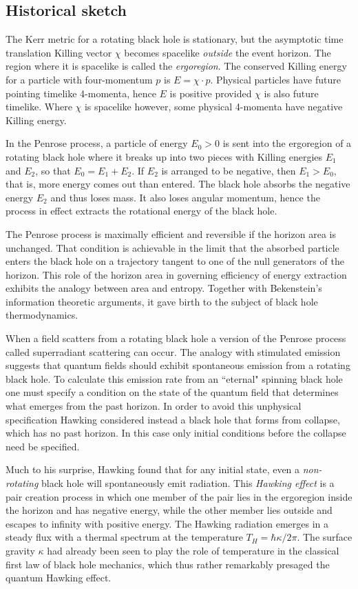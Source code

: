\documentclass[12pt]{article}
\begin{document}
\subsection{Historical sketch}
The Kerr metric for a rotating black
hole is stationary, but the asymptotic time translation Killing vector
$\chi$ becomes spacelike {\it outside} the event horizon. 
The region where it is spacelike is called the {\it ergoregion}. 
The conserved Killing energy for a particle with four-momentum $p$
is $E=\chi\cdot p$. Physical particles have future pointing timelike 
4-momenta, hence $E$ is positive provided $\chi$ is also future timelike. 
Where $\chi$ is spacelike however, some physical 4-momenta have negative Killing energy.

In the Penrose process, a particle of energy $E_0>0$ is sent 
into the ergoregion of a rotating black hole where it breaks up 
into two pieces with Killing energies $E_1$ and $E_2$, so that 
$E_0=E_1+E_2$. If $E_2$ is arranged to be negative, then $E_1>E_0$,
that is, more energy comes out than entered. 
The black hole absorbs the negative energy $E_2$ and thus
loses mass. It also loses angular momentum,
hence the process in effect extracts the rotational energy of 
the black hole. 

The Penrose process is maximally efficient and reversible if
the horizon area is unchanged. That condition is achievable in
the limit that the absorbed particle enters the black hole on a trajectory
tangent to one of the null generators of the horizon. This 
role of the horizon area in governing efficiency of energy extraction
exhibits the analogy between area and entropy. Together with Bekenstein's
information theoretic arguments, it gave birth to the subject of
black hole thermodynamics.

When a field scatters from a rotating black hole
a version of the Penrose process called
superradiant scattering can occur. 
The analogy with stimulated 
emission suggests that quantum fields should exhibit 
spontaneous emission from a rotating black hole. 
To calculate this emission rate from an ``eternal"
spinning black hole one must specify a condition on the
state of the quantum field that determines what emerges
from the past horizon. In order to avoid this unphysical
specification Hawking considered instead
a black hole that forms from collapse, which has no past
horizon. In this case only  initial conditions 
before the collapse need be specified. 

Much to his surprise,
Hawking found that for any initial state, even 
a {\it non-rotating} black hole will spontaneously
emit radiation. This {\it Hawking effect}
is a pair creation process in which one member of the pair
lies in the ergoregion inside the horizon and has negative
energy, while the other member lies outside 
and escapes to infinity with positive energy.
The Hawking radiation emerges in a steady flux
with a thermal spectrum at the temperature
$T_H=\hbar\kappa/2\pi$. The surface gravity $\kappa$
had already been seen to play the role of temperature 
in the classical first law of black hole mechanics, which thus
rather remarkably presaged the quantum Hawking effect.
\end{document}

